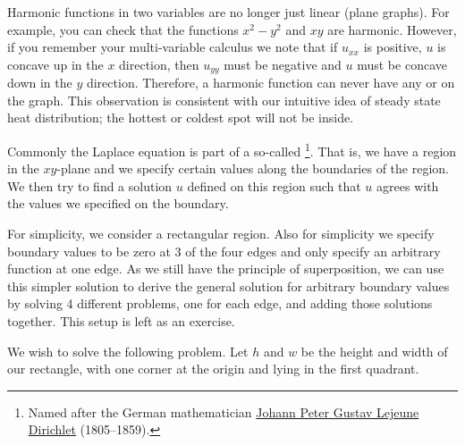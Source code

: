 Harmonic functions in two variables are no longer just linear (plane
graphs).  For example, you can check that the functions
$x^2-y^2$ and $xy$ are harmonic.  However, if you remember your
multi-variable calculus we note that if $u_{xx}$ is positive, $u$ is concave
up in the $x$ direction, then $u_{yy}$ must be negative and $u$ must be
concave down in the $y$ direction.  Therefore, a harmonic function can never
have any  or  on the graph.  This observation is
consistent with our intuitive idea of steady state heat distribution;
the hottest or coldest spot will not be inside.

Commonly the Laplace equation is part of a so-called
\emph{}%
\footnote{Named after the German mathematician
\href{http://en.wikipedia.org/wiki/Dirichlet}{Johann Peter Gustav Lejeune Dirichlet}
(1805--1859).}.
That
is, we have a region in the $xy$-plane and we specify certain values along
the boundaries of the region.  We then try to find a solution $u$ defined on
this region such that $u$ agrees with the values we specified on the
boundary.

For simplicity, we consider a rectangular region.  Also for simplicity
we specify boundary values to be zero at 3 of the four edges and only
specify an arbitrary function at one edge.  As we still have the
principle of superposition, we can use this simpler
solution to derive the general
solution for arbitrary boundary values by solving 4 different problems,
one for each edge, and adding those solutions together.
This setup is left as an exercise.

We wish to solve the following problem.  Let $h$ and $w$
be the height and width of our rectangle, with one corner at the origin and
lying in the first quadrant.

